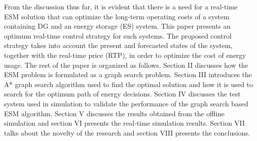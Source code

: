 From the discussion thus far, it is evident that there is a need for a real-time ESM solution that can optimize the long-term operating costs of a system containing DG and an energy storage (ES) system. This paper presents an optimum real-time control strategy for such systems. The proposed control strategy takes into account the present and forecasted states of the system, together with the real-time price (RTP), in order to optimize the cost of energy usage. The rest of the paper is organized as follows. Section II discusses how the ESM problem is formulated as a graph search problem. Section III introduces the A* graph search algorithm used to find the optimal solution and how it is used to search for the optimum path of energy decisions. Section IV discusses the test system used in simulation to validate the performance of the graph search based ESM algorithm. Section V discusses the results obtained from the offline simulation and section VI presents the real-time simulation results. Section VII talks about the novelty of the research and section VIII presents the conclusions.